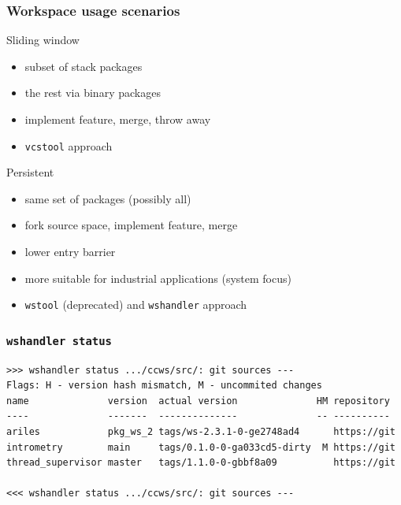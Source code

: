 \documentclass[hyperref={colorlinks=false, breaklinks=true},11pt]{beamer}
\begin{document}
\begin{frame}
    \frametitle{Workspace usage scenarios}

    \begin{block}{Sliding window}
        \begin{itemize}
            \item subset of stack packages
            \item the rest via binary packages
            \item implement feature, merge, throw away
            \item \texttt{vcstool} approach
        \end{itemize}
    \end{block}

    \begin{block}{Persistent}
        \begin{itemize}
            \item same set of packages (possibly all)
            \item fork source space, implement feature, merge
            \item lower entry barrier
            \item more suitable for industrial applications (system focus)
            \item \texttt{wstool} (deprecated) and \texttt{wshandler} approach
        \end{itemize}
    \end{block}
\end{frame}

\begin{frame}[fragile]
    \frametitle{\texttt{wshandler status}}
\footnotesize{%
\begin{verbatim}
>>> wshandler status .../ccws/src/: git sources ---
Flags: H - version hash mismatch, M - uncommited changes
name              version  actual version              HM repository
----              -------  --------------              -- ----------
ariles            pkg_ws_2 tags/ws-2.3.1-0-ge2748ad4      https://git
intrometry        main     tags/0.1.0-0-ga033cd5-dirty  M https://git
thread_supervisor master   tags/1.1.0-0-gbbf8a09          https://git

<<< wshandler status .../ccws/src/: git sources ---
\end{verbatim}
}
\end{frame}
\end{document}
